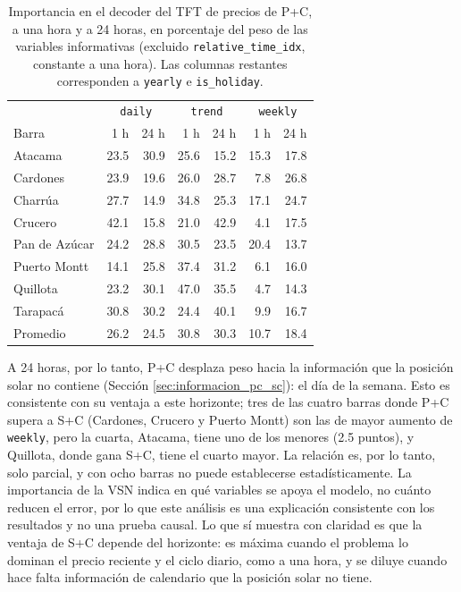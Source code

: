 \begin{table}[htbp]
    \centering
    \begin{tabular}{lrrrrrr}
        \toprule
        & \multicolumn{2}{c}{\texttt{daily}} & \multicolumn{2}{c}{\texttt{trend}} & \multicolumn{2}{c}{\texttt{weekly}} \\
        Barra & 1 h & 24 h & 1 h & 24 h & 1 h & 24 h \\
        \midrule
        Atacama       & 23.5 & 30.9 & 25.6 & 15.2 & 15.3 & 17.8 \\
        Cardones      & 23.9 & 19.6 & 26.0 & 28.7 &  7.8 & 26.8 \\
        Charrúa       & 27.7 & 14.9 & 34.8 & 25.3 & 17.1 & 24.7 \\
        Crucero       & 42.1 & 15.8 & 21.0 & 42.9 &  4.1 & 17.5 \\
        Pan de Azúcar & 24.2 & 28.8 & 30.5 & 23.5 & 20.4 & 13.7 \\
        Puerto Montt  & 14.1 & 25.8 & 37.4 & 31.2 &  6.1 & 16.0 \\
        Quillota      & 23.2 & 30.1 & 47.0 & 35.5 &  4.7 & 14.3 \\
        Tarapacá      & 30.8 & 30.2 & 24.4 & 40.1 &  9.9 & 16.7 \\
        \midrule
        Promedio      & 26.2 & 24.5 & 30.8 & 30.3 & 10.7 & 18.4 \\
        \bottomrule
    \end{tabular}
    \vspace{0.2cm}
    \caption{Importancia en el decoder del TFT de precios de P+C, a una hora y a 24 horas, en porcentaje del peso de las variables informativas (excluido \texttt{relative\_time\_idx}, constante a una hora). Las columnas restantes corresponden a \texttt{yearly} e \texttt{is\_holiday}.}
    \label{tab:h24_decoder_pc}
\end{table}

A 24 horas, por lo tanto, P+C desplaza peso hacia la información que la posición solar no contiene (Sección \ref{sec:informacion_pc_sc}): el día de la semana. Esto es consistente con su ventaja a este horizonte; tres de las cuatro barras donde P+C supera a S+C (Cardones, Crucero y Puerto Montt) son las de mayor aumento de \texttt{weekly}, pero la cuarta, Atacama, tiene uno de los menores (2.5 puntos), y Quillota, donde gana S+C, tiene el cuarto mayor. La relación es, por lo tanto, solo parcial, y con ocho barras no puede establecerse estadísticamente. La importancia de la VSN indica en qué variables se apoya el modelo, no cuánto reducen el error, por lo que este análisis es una explicación consistente con los resultados y no una prueba causal. Lo que sí muestra con claridad es que la ventaja de S+C depende del horizonte: es máxima cuando el problema lo dominan el precio reciente y el ciclo diario, como a una hora, y se diluye cuando hace falta información de calendario que la posición solar no tiene.

